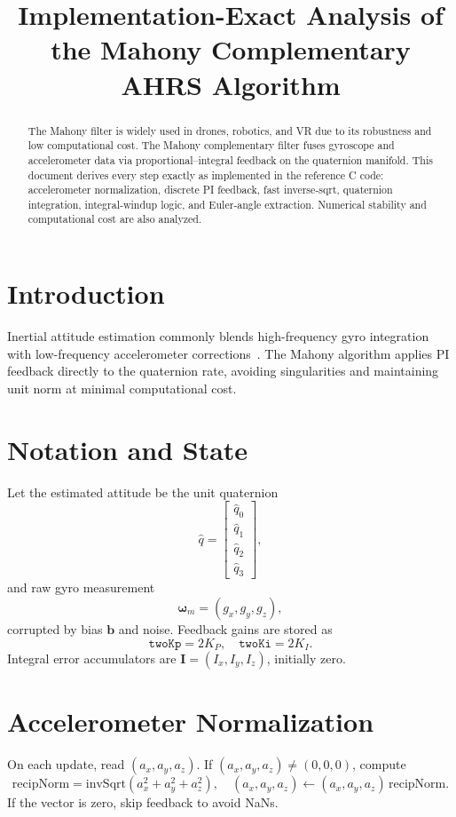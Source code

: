 \documentclass[12pt]{article}
\title{Implementation-Exact Analysis of the Mahony Complementary AHRS Algorithm}
\date{}
\begin{document}
\maketitle

\begin{abstract}
The Mahony filter is widely used in drones, robotics, and VR due to its robustness and low computational cost. The Mahony complementary filter fuses gyroscope and accelerometer data via proportional–integral feedback on the quaternion manifold.  This document derives every step exactly as implemented in the reference C code: accelerometer normalization, discrete PI feedback, fast inverse‐sqrt, quaternion integration, integral‐windup logic, and Euler‐angle extraction.  Numerical stability and computational cost are also analyzed.
\end{abstract}

\section{Introduction}
Inertial attitude estimation commonly blends high-frequency gyro integration with low-frequency accelerometer corrections~\cite{Mahony2008}.  The Mahony algorithm applies PI feedback directly to the quaternion rate, avoiding singularities and maintaining unit norm at minimal computational cost.

\section{Notation and State}
Let the estimated attitude be the unit quaternion 
\[
\hat q = \begin{bmatrix}\hat q_0\\\hat q_1\\\hat q_2\\\hat q_3\end{bmatrix},
\]
and raw gyro measurement 
\[
\boldsymbol\omega_m = (g_x,g_y,g_z),
\]
corrupted by bias $\mathbf b$ and noise.  Feedback gains are stored as 
\[
\texttt{twoKp} = 2K_P,\quad \texttt{twoKi} = 2K_I.
\]
Integral error accumulators are 
\(\mathbf I=(I_x,I_y,I_z)\), initially zero.

\section{Accelerometer Normalization}
On each update, read $(a_x,a_y,a_z)$.  If $(a_x,a_y,a_z)\neq(0,0,0)$, compute
\[
\text{recipNorm} = \mathrm{invSqrt}(a_x^2+a_y^2+a_z^2),
\quad
(a_x,a_y,a_z)\leftarrow (a_x,a_y,a_z)\,\text{recipNorm}.
\]
If the vector is zero, skip feedback to avoid NaNs.
\end{document}
